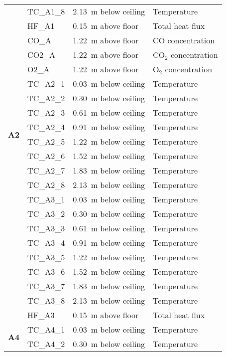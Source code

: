 \begin{longtable}[c]{c|lll}
 & TC\_A1\_8  & 2.13~m below ceiling & Temperature \\
\cline{2-4}
 & HF\_A1	  & 0.15~m above floor   & Total heat flux \\
\cline{2-4}
 & CO\_A      & 1.22~m above floor   & CO concentration \\
 & CO2\_A     & 1.22~m above floor   & CO$_2$ concentration \\
 & O2\_A      & 1.22~m above floor   & O$_2$ concentration \\
\midrule
\multirow{8}{*}{\large{\textbf{A2}}}
 & TC\_A2\_1  & 0.03~m below ceiling & Temperature \\
 & TC\_A2\_2  & 0.30~m below ceiling & Temperature \\
 & TC\_A2\_3  & 0.61~m below ceiling & Temperature \\
 & TC\_A2\_4  & 0.91~m below ceiling & Temperature \\
 & TC\_A2\_5  & 1.22~m below ceiling & Temperature \\
 & TC\_A2\_6  & 1.52~m below ceiling & Temperature \\
 & TC\_A2\_7  & 1.83~m below ceiling & Temperature \\
 & TC\_A2\_8  & 2.13~m below ceiling & Temperature \\
\bottomrule
\newpage
 \multirow{9}{*}{\large{\textbf{A3}}}
 & TC\_A3\_1  & 0.03~m below ceiling & Temperature \\
 & TC\_A3\_2  & 0.30~m below ceiling & Temperature \\
 & TC\_A3\_3  & 0.61~m below ceiling & Temperature \\
 & TC\_A3\_4  & 0.91~m below ceiling & Temperature \\
 & TC\_A3\_5  & 1.22~m below ceiling & Temperature \\
 & TC\_A3\_6  & 1.52~m below ceiling & Temperature \\
 & TC\_A3\_7  & 1.83~m below ceiling & Temperature \\
 & TC\_A3\_8  & 2.13~m below ceiling & Temperature \\
\cline{2-4}
 & HF\_A3	  & 0.15~m above floor   & Total heat flux \\
\midrule
\multirow{12}{*}{\large\textbf{A4}}
 & TC\_A4\_1  & 0.03~m below ceiling & Temperature \\
 & TC\_A4\_2  & 0.30~m below ceiling & Temperature \\

\end{longtable}
